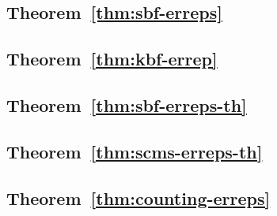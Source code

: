 \label{sec:keyless-proof}
\label{sec:proof/sbf-erreps}
\label{sec:proof/kbf-errep}
\label{sec:proof/sbf-erreps-th}
\label{sec:proof/scms-erreps-th}
\label{sec:proof/counting-erreps}

%

\subsection*{Theorem~\ref{thm:sbf-erreps}}


\subsection*{Theorem~\ref{thm:kbf-errep}}


\subsection*{Theorem~\ref{thm:sbf-erreps-th}}


\subsection*{Theorem~\ref{thm:scms-erreps-th}}


\subsection*{Theorem~\ref{thm:counting-erreps}}

